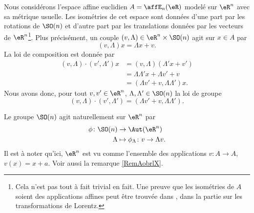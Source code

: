 Nous considérons l'espace affine euclidien \( A=\affE_n(\eR)\) modelé sur \( \eR^n\) avec sa métrique usuelle. Les isométries de cet espace sont données d'une part par les rotations de \( \SO(n)\) et d'autre part par les translations données par les vecteurs de \( \eR^n\)\footnote{Cela n'est pas tout à fait trivial en fait. Une preuve que les isométries de \( A\) soient des applications affines peut être trouvée dans \cite{echa}, dans la partie sur les transformations de Lorentz.}. Plus précisément, un couple \( (v,\Lambda)\in \eR^n\times\SO(n)\) agit sur \( x\in A\) par
\begin{equation}
    (v,\Lambda)x=\Lambda x+v.
\end{equation}
La loi de composition est donnée par
\begin{subequations}
    \begin{align}
        (v,\Lambda)\cdot(v',\Lambda')x&=(v,\Lambda)(\Lambda'x+v')\\
        &=\Lambda\Lambda'x+\Lambda v'+v\\
        &=(\Lambda v'+v,\Lambda\Lambda')x.
    \end{align}
\end{subequations}
Nous avons donc, pour tout \( v,v'\in \eR^n\), \( \Lambda,\Lambda'\in\SO(n)\) la loi de groupe
\begin{equation}    \label{EqDiHcut}
        (v,\Lambda)\cdot(v',\Lambda')=(\Lambda v'+v,\Lambda\Lambda').
\end{equation}
    
Le groupe \( \SO(n)\) agit naturellement sur \( \eR^n\) par
\begin{equation}
    \begin{aligned}
        \phi\colon \SO(n)&\to \Aut(\eR^n) \\
        \Lambda&\mapsto \phi_{\Lambda}\colon v\to \Lambda v. 
    \end{aligned}
\end{equation}
Il est à noter qu'ici, \( \eR^n\) est vu comme l'ensemble des applications \( v\colon A\to A\), \( v(x)=x+a\). Voir aussi la remarque \ref{RemAobrlX}.


